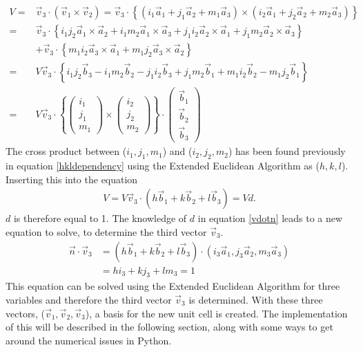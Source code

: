 \documentclass[11pt]{article} %
\begin{document}
\begin{eqnarray}
V = & \vec{v}_3 \cdot (\vec{v}_1 \times \vec{v}_2) = \vec{v}_3 \cdot \left\lbrace ( i_1\vec{a}_1+j_1\vec{a}_2+m_1\vec{a}_3) \times ( i_2\vec{a}_1+j_2\vec{a}_2+m_2\vec{a}_3) \right\rbrace \nonumber \\
= & \vec{v}_3 \cdot \left\lbrace i_1 j_2 \vec{a}_1 \times \vec{a}_2 + i_1 m_2 \vec{a}_1 \times \vec{a}_3 + j_1 i_2 \vec{a}_2 \times \vec{a}_1 + j_1 m_2 \vec{a}_2 \times \vec{a}_3 \right\rbrace \nonumber \\ & + \vec{v}_3 \cdot \left\lbrace m_1 i_2 \vec{a}_3 \times \vec{a}_1 + m_1 j_2 \vec{a}_3 \times \vec{a}_2 \right\rbrace \nonumber  \\
= & V\vec{v}_3 \cdot \left\lbrace i_1 j_2 \vec{b}_3 - i_1 m_2 \vec{b}_2 - j_1 i_2 \vec{b}_3 + j_1 m_2 \vec{b}_1 + m_1 i_2 \vec{b}_2 - m_1 j_2 \vec{b}_1 \right\rbrace \nonumber \\
= & V \vec{v}_3 \cdot \left\lbrace \left(\begin{array}{c} i_1 \\ j_1 \\ m_1 \end{array}\right) \times \left(\begin{array}{c} i_2 \\ j_2 \\ m_2 \end{array}\right) \right\rbrace \cdot \left(\begin{array}{c} \vec{b}_1 \\ \vec{b}_2 \\ \vec{b}_3 \end{array} \right)
\end{eqnarray}
The cross product between ($i_1, j_1, m_1$) and ($i_2, j_2, m_2$) has been found previously in equation \ref{hkldependency} using the Extended Euclidean Algorithm as ($h,k,l$). Inserting this into the equation 
\begin{eqnarray}
V = V \vec{v}_3 \cdot (h\vec{b}_1+k\vec{b}_2+l\vec{b}_3) = Vd.
\end{eqnarray}
$d$ is therefore equal to 1. The knowledge of $d$ in equation \ref{vdotn} leads to a new equation to solve, to determine the third vector $\vec{v}_3$.
\begin{eqnarray}
\vec{n} \cdot \vec{v}_3 & = (h \vec{b}_1 + k \vec{b}_2 + l \vec{b}_3 ) \cdot (i_3\vec{a}_1,j_3\vec{a}_2,m_3\vec{a}_3) \nonumber \\
 & = hi_3+kj_3+lm_3 = 1 \label{eq:ext_gcd}
\end{eqnarray}
This equation can be solved using the Extended Euclidean Algorithm for three variables and therefore the third vector $\vec{v}_3$ is determined. With these three vectors, ($\vec{v}_1, \vec{v}_2, \vec{v}_3$), a basis for the new unit cell is created. The implementation of this will be described in the following section, along with some ways to get around the numerical issues in Python.
\end{document}
